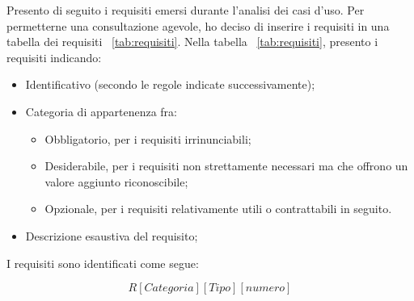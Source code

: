 Presento di seguito i requisiti emersi durante l’analisi dei casi d’uso.
Per permetterne una consultazione agevole, ho deciso di inserire i requisiti in una tabella dei requisiti ~\ref{tab:requisiti}.
Nella tabella ~\ref{tab:requisiti}, presento i requisiti indicando:
\begin{itemize}
	\item Identificativo (secondo le regole indicate successivamente);
	\item Categoria di appartenenza fra:
	\begin{itemize}
		\item Obbligatorio, per i requisiti irrinunciabili;
		\item Desiderabile, per i requisiti non strettamente necessari ma che offrono un
    valore aggiunto riconoscibile;
		\item Opzionale, per i requisiti relativamente utili o contrattabili in seguito.
	\end{itemize}
	\item Descrizione esaustiva del requisito;
\end{itemize}

I requisiti sono identificati come segue:

\begin{figure}
  \centering
  \[ R[Categoria][Tipo][numero] \]
\end{figure}

